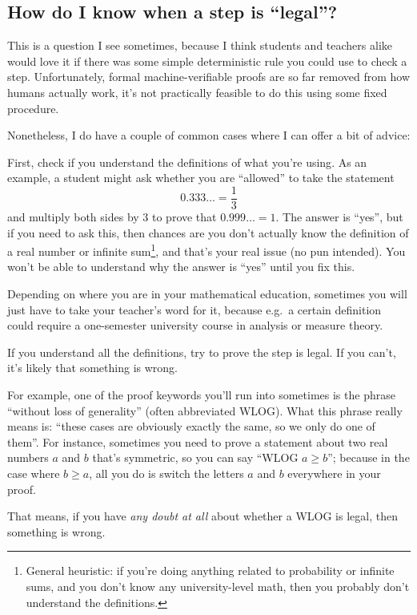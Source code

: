 \documentclass[11pt]{scrartcl}
\begin{document}
\subsection{How do I know when a step is ``legal''?}
This is a question I see sometimes,
because I think students and teachers alike would love it if
there was some simple deterministic rule you could use to check a step.
Unfortunately, formal machine-verifiable proofs
are so far removed from how humans actually work,
it's not practically feasible to do this using some fixed procedure.

Nonetheless, I do have a couple of common cases
where I can offer a bit of advice:
\begin{itemize}
  \ii First,
  \alert{check if you understand the definitions of what you're using}.
  As an example, a student might ask whether you
  are ``allowed'' to take the statement
  \[ 0.333\dotso = \frac13 \]
  and multiply both sides by $3$ to prove that $0.999\dotso = 1$.
  The answer is ``yes'',  but if you need to ask this,
  then chances are you don't actually know the definition
  of a real number or infinite sum\footnote{General heuristic:
    if you're doing anything related to probability or infinite sums,
    and you don't know any university-level math,
    then you probably don't understand the definitions.},
  and that's your real issue (no pun intended).
  You won't be able to understand why the answer is ``yes'' until you fix this.

  Depending on where you are in your mathematical education, sometimes you
  will just have to take your teacher's word for it,
  because e.g.\ a certain definition could require
  a one-semester university course in analysis or measure theory.

  \ii If you understand all the definitions,
  \alert{try to prove the step is legal}.
  If you can't, it's likely that something is wrong.

  For example, one of the proof keywords you'll run into sometimes
  is the phrase ``without loss of generality'' (often abbreviated WLOG).
  What this phrase really means is:
  ``these cases are obviously exactly the same, so we only do one of them''.
  For instance, sometimes you need to prove a statement about two
  real numbers $a$ and $b$ that's symmetric,
  so you can say ``WLOG $a \ge b$'';
  because in the case where $b \ge a$,
  all you do is switch the letters $a$ and $b$ everywhere in your proof.

  That means, if you have \emph{any doubt at all}
  about whether a WLOG is legal, then something is wrong.


\end{itemize}
\end{document}
